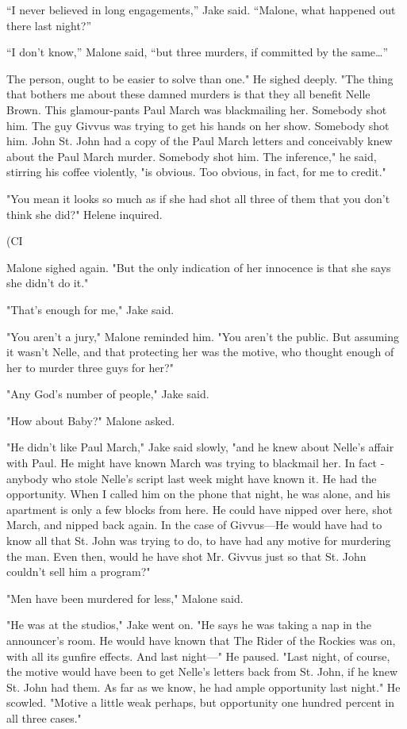 \documentclass{novel}
\begin{document}
“I never believed in long engagements,” Jake said. “Malone, what happened out there last night?”

“I don’t know,” Malone said, “but three murders, if committed by the same…”

The person, ought to be easier to solve than one." He sighed deeply. "The thing that bothers me about these damned murders is that they all benefit Nelle Brown. This glamour-pants Paul March was blackmailing her. Somebody shot him. The guy Givvus was trying to get his hands on her show. Somebody shot him. John St. John had a copy of the Paul March letters and conceivably knew about the Paul March murder. Somebody shot him. The inference," he said, stirring his coffee violently, "is obvious. Too obvious, in fact, for me to credit."

"You mean it looks so much as if she had shot all three of them that you don't think she did?" Helene inquired.

(CI

Malone sighed again. "But the only indication of her innocence is that she says she didn't do it."

"That's enough for me," Jake said.

"You aren't a jury," Malone reminded him. "You aren't the public. But assuming it wasn't Nelle, and that protecting her was the motive, who thought enough of her to murder three guys for her?"

"Any God's number of people," Jake said.

"How about Baby?" Malone asked.

"He didn't like Paul March," Jake said slowly, "and he knew about Nelle's affair with Paul. He might have known March was trying to blackmail her. In fact - anybody who stole Nelle's script last week might have known it. He had the opportunity. When I called him on the phone that night, he was alone, and his apartment is only a few blocks from here. He could have nipped over here, shot March, and nipped back again. In the case of Givvus—He would have had to know all that St. John was trying to do, to have had any motive for murdering the man. Even then, would he have shot Mr. Givvus just so that St. John couldn't sell him a program?"

"Men have been murdered for less," Malone said.

"He was at the studios," Jake went on. "He says he was taking a nap in the announcer's room. He would have known that The Rider of the Rockies was on, with all its gunfire effects. And last night—" He paused. "Last night, of course, the motive would have been to get Nelle's letters back from St. John, if he knew St. John had them. As far as we know, he had ample opportunity last night." He scowled. "Motive a little weak perhaps, but opportunity one hundred percent in all three cases."
\end{document}
